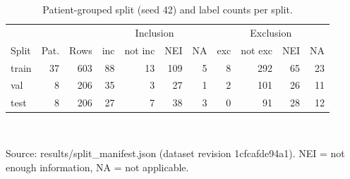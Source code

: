 \begin{table}[t]
\centering
\caption{Patient-grouped split (seed 42) and label counts per split.}
\label{tab:split}
\footnotesize
\setlength{\tabcolsep}{4pt}
\begin{tabular}{lrr|rrrr|rrrr}
\toprule
 & & & \multicolumn{4}{c|}{Inclusion} & \multicolumn{4}{c}{Exclusion} \\ Split & Pat. & Rows & inc & not inc & NEI & NA & exc & not exc & NEI & NA \\
\midrule
train & 37 & 603 & 88 & 13 & 109 & 5 & 8 & 292 & 65 & 23 \\
val & 8 & 206 & 35 & 3 & 27 & 1 & 2 & 101 & 26 & 11 \\
test & 8 & 206 & 27 & 7 & 38 & 3 & 0 & 91 & 28 & 12 \\
\bottomrule
\end{tabular}
\\[2pt]\parbox{0.95\linewidth}{\scriptsize Source: results/split\_manifest.json (dataset revision 1cfcafde94a1). NEI = not enough information, NA = not applicable.}
\end{table}
